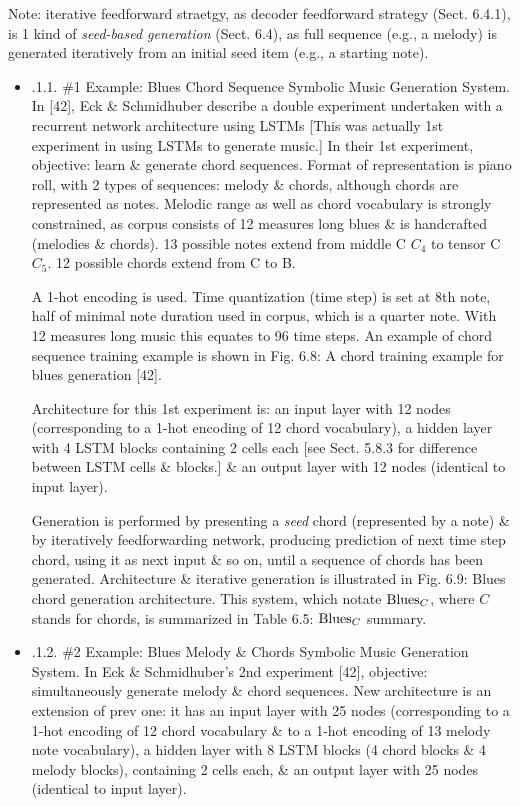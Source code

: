 \documentclass{article}
\begin{document}
\begin{itemize}
\begin{itemize}
\begin{itemize}
			Note: iterative feedforward straetgy, as decoder feedforward strategy (Sect. 6.4.1), is 1 kind of {\it seed-based generation} (Sect. 6.4), as full sequence (e.g., a melody) is generated iteratively from an initial seed item (e.g., a starting note).
			\begin{itemize}
				\item {.1.1. \#1 Example: Blues Chord Sequence Symbolic Music Generation System.} In [42], {\sc Eck \& Schmidhuber} describe a double experiment undertaken with a recurrent network architecture using LSTMs [This was actually 1st experiment in using LSTMs to generate music.] In their 1st experiment, objective: learn \& generate chord sequences. Format of representation is piano roll, with 2 types of sequences: melody \& chords, although chords are represented as notes. Melodic range as well as chord vocabulary is strongly constrained, as corpus consists of 12 measures long blues \& is handcrafted (melodies \& chords). 13 possible notes extend from middle C $C_4$ to tensor C $C_5$. 12 possible chords extend from C to B.

				A 1-hot encoding is used. Time quantization (time step) is set at 8th note, half of minimal note duration used in corpus, which is a quarter note. With 12 measures long music this equates to 96 time steps. An example of chord sequence training example is shown in {\sf Fig. 6.8: A chord training example for blues generation [42].}

				Architecture for this 1st experiment is: an input layer with 12 nodes (corresponding to a 1-hot encoding of 12 chord vocabulary), a hidden layer with 4 LSTM blocks containing 2 cells each [see Sect. 5.8.3 for difference between LSTM cells \& blocks.] \& an output layer with 12 nodes (identical to input layer).

				Generation is performed by presenting a {\it seed} chord (represented by a note) \& by iteratively feedforwarding network, producing prediction of next time step chord, using it as next input \& so on, until a sequence of chords has been generated. Architecture \& iterative generation is illustrated in {\sf Fig. 6.9: Blues chord generation architecture}. This system, which notate ${\rm Blues}_C$, where $C$ stands for chords, is summarized in {\sf Table 6.5: ${\rm Blues}_C$ summary.}
				\item {.1.2. \#2 Example: Blues Melody \& Chords Symbolic Music Generation System.} In {\sc Eck \& Schmidhuber}'s 2nd experiment [42], objective: simultaneously generate melody \& chord sequences. New architecture is an extension of prev one: it has an input layer with 25 nodes (corresponding to a 1-hot encoding of 12 chord vocabulary \& to a 1-hot encoding of 13 melody note vocabulary), a hidden layer with 8 LSTM blocks (4 chord blocks \& 4 melody blocks), containing 2 cells each, \& an output layer with 25 nodes (identical to input layer).


\end{itemize}
\end{itemize}
\end{itemize}
\end{itemize}
\end{document}
